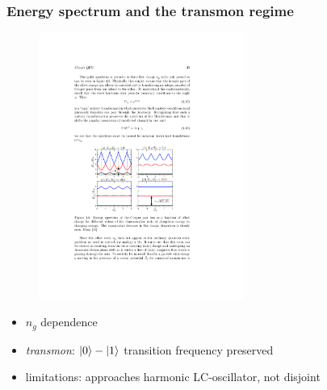 \documentclass[10pt]{beamer}
\begin{document}
\begin{frame}
\frametitle{Energy spectrum and the transmon regime}

\begin{figure}
	\centering
	\includegraphics[width=0.6\textwidth]{cpb_energies.pdf}
\end{figure}

\begin{itemize}
\item $n_g$ dependence
\item \emph{transmon}: $\ket{0}-\ket{1}$ transition frequency preserved
\item limitations: approaches harmonic LC-oscillator, not disjoint
\end{itemize}

\end{frame}

\end{document}

